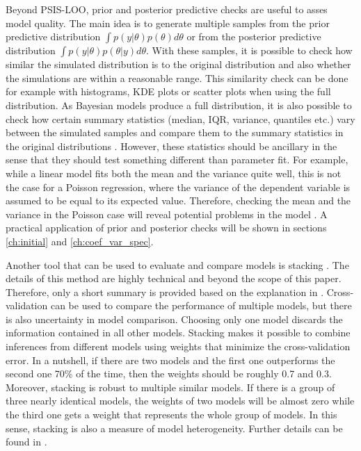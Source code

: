 Beyond PSIS-LOO, prior and posterior predictive checks are useful to asses model quality.
The main idea is to generate multiple samples from the prior predictive distribution $\int  p(y|\theta)p(\theta)d\theta$ or from the posterior predictive distribution $\int p(y | \theta) p(\theta|y) d\theta$.
With these samples, it is possible to check how similar the simulated distribution is to the original distribution and also whether the simulations are within a reasonable range.
This similarity check can be done for example with histograms, KDE plots or scatter plots when using the full distribution.
As Bayesian models produce a full distribution, it is also possible to check how certain summary statistics (median, IQR, variance, quantiles etc.) vary between the simulated samples and compare them to the summary statistics in the original distributions \citep[Chapter 6]{gelman_bayesian_2014}.
However, these statistics should be ancillary in the sense that they should test something different than parameter fit.
For example, while a linear model fits both the mean and the variance quite well, this is not the case for a Poisson regression, where the variance of the dependent variable is assumed to be equal to its expected value.
Therefore, checking the mean and the variance in the Poisson case will reveal potential problems in the model \citep[Chapter 27.3]{stan_development_team_stan_2021}.
A practical application of prior and posterior checks will be shown in sections \ref{ch:initial} and \ref{ch:coef_var_spec}.

Another tool that can be used to evaluate and compare models is stacking \citep{yao_using_2018}.
The details of this method are highly technical and beyond the scope of this paper.
Therefore, only a short summary is provided based on the explanation in \cite{gelman_bayesian_2020}.
Cross-validation can be used to compare the performance of multiple models, but there is also uncertainty in model comparison.
Choosing only one model discards the information contained in all other models.
Stacking makes it possible to combine inferences from different models using weights that minimize the cross-validation error.
In a nutshell, if there are two models and the first one outperforms the second one 70\% of the time, then the weights should be roughly 0.7 and 0.3.
Moreover, stacking is robust to multiple similar models.
If there is a group of three nearly identical models, the weights of two models will be almost zero while the third one gets a weight that represents the whole group of models.
In this sense, stacking is also a measure of model heterogeneity.
Further details can be found in \cite{yao_using_2018}.




